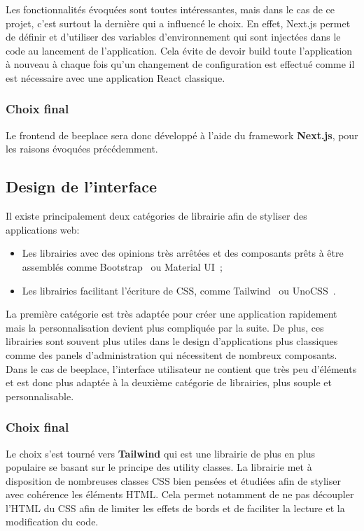 Les fonctionnalités évoquées sont toutes intéressantes, mais dans le cas de ce projet, c'est surtout la dernière qui a influencé le choix. En effet, Next.js permet de définir et d'utiliser des variables d'environnement qui sont injectées dans le code au lancement de l'application. Cela évite de devoir build toute l'application à nouveau à chaque fois qu'un changement de configuration est effectué comme il est nécessaire avec une application React classique.

\subsubsection{Choix final}

Le frontend de \gls{beeplace} sera donc développé à l'aide du framework \textbf{Next.js}, pour les raisons évoquées précédemment.

\subsection{Design de l'interface}

Il existe principalement deux catégories de librairie afin de styliser des applications web:

\begin{itemize}
  \item Les librairies avec des opinions très arrêtées et des composants prêts à être assemblés comme Bootstrap~\cite{bootstrap} ou Material UI~\cite{mui};
  \item Les librairies facilitant l'écriture de CSS, comme Tailwind~\cite{tailwindcss} ou UnoCSS~\cite{unocss}.
\end{itemize}

La première catégorie est très adaptée pour créer une application rapidement mais la personnalisation devient plus compliquée par la suite. De plus, ces librairies sont souvent plus utiles dans le design d'applications plus classiques comme des panels d'administration qui nécessitent de nombreux composants. Dans le cas de \gls{beeplace}, l'interface utilisateur ne contient que très peu d'éléments et est donc plus adaptée à la deuxième catégorie de librairies, plus souple et personnalisable.

\subsubsection{Choix final}

Le choix s'est tourné vers \textbf{Tailwind} qui est une librairie de plus en plus populaire se basant sur le principe des utility classes. La librairie met à disposition de nombreuses classes CSS bien pensées et étudiées afin de styliser avec cohérence les éléments HTML. Cela permet notamment de ne pas découpler l'HTML du CSS afin de limiter les effets de bords et de faciliter la lecture et la modification du code.

